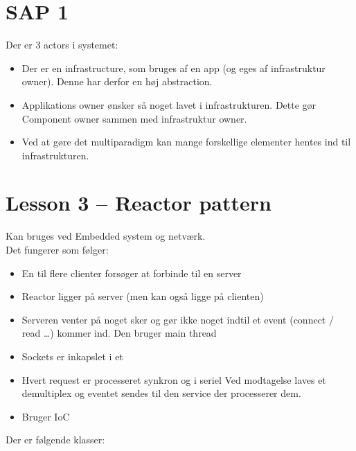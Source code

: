 \documentclass[oneside, 10pt]{memoir}
\begin{document}
\section{SAP 1}
Der er 3 actors i systemet:
\begin{itemize}
\item Der er en infrastructure, som bruges af en app (og eges af infrastruktur owner). Denne har derfor en høj abstraction.
\item Applikations owner ønsker så noget lavet i infrastrukturen. 
Dette gør Component owner sammen med infrastruktur owner.
\item Ved at gøre det multiparadigm kan mange forskellige elementer hentes ind til infrastrukturen.
\end{itemize}












\newpage
\section{Lesson 3 -- Reactor pattern}

Kan bruges ved Embedded system og netværk.
\\
Det fungerer som følger:

\begin{itemize}
\item En til flere clienter forsøger at forbinde til en server
\item Reactor ligger på server (men kan også ligge på clienten)

\item Serveren venter på noget sker og gør ikke noget indtil et event (connect / read \dots) kommer ind.
\subitem Den bruger main thread

\item Sockets er inkapslet i et 
\item Hvert request er processeret synkron og i seriel
\subitem Ved modtagelse laves et demultiplex og eventet sendes til den service der processerer dem.
\item Bruger IoC
\end{itemize}
Der er følgende klasser:
\end{document}
